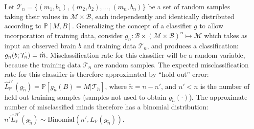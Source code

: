 \documentclass{article}
\newcommand{\mB}{\mathcal{B}}
\newcommand{\mM}{\mathcal{M}}
\newcommand{\PP}{\mathbb{P}}           %
\providecommand{\mc}[1]{\mathcal{#1}}
\providecommand{\mh}[1]{\widehat{#1}}
\providecommand{\mt}[1]{\widetilde{#1}}
\newcommand{\hL}{\widehat{L}}
\providecommand{\tr}[1]{\textcolor{black}{#1}}
\begin{document}
Let $\mc{T}_n=\{(m_1,b_1), (m_2,b_2), \ldots, (m_n,b_n)\}$ be a set of random samples taking their values in $\mc{M} \times \mc{B}$, each independently and identically distributed according to $\PP[M,B]$.  Generalizing the concept of a classifier $g$ to allow incorporation of training data, consider $g_n:\mB \times (\mc{M} \times \mc{B})^n \mapsto \mM$ which takes as input an observed brain  $b$ and training data $\mc{T}_n$, and produces a classification: $g_n(b;\tr{\mc{T}_n})=\mh{m}$.  Misclassification rate for this classifier will be a random variable, because the training data $\mc{T}_n$ are random samples.  The expected misclassification rate for this classifier is therefore approximated by ``hold-out'' error:
$\hL^{n'}_{\PP}(g_{\mt{n}}) = \PP[g_{\mt{n}}(B)=M | \mc{T}_{\mt{n}}]$,
where $\mt{n}=n-n'$, and $n'<n$ is the number of held-out training samples (samples not used to obtain $g_{\mt{n}}(\cdot)$).
The approximate  number of misclassified minds therefore has a binomial distribution:  $n' \hL^{n'}_{\PP}(g_{\mt{n}}) \sim \text{Binomial}(n',L_{\PP}(g_{\mt{n}}))$.




\clearpage




\end{document}
